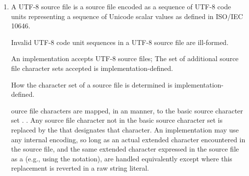 \documentclass{wg21}
\begin{document}
\begin{enumerate}
    \item

\begin{addedblock}
    A UTF-8 source file is a source file encoded as a sequence of UTF-8 code units representing a sequence of Unicode scalar values as defined in ISO/IEC 10646.

    \begin{note}
        Invalid UTF-8 code unit sequences in a UTF-8 source file are ill-formed.
    \end{note}
    An implementation accepts UTF-8 source files; The set of additional source file character sets accepted is implementation-defined.

    How the character set of a source file is determined is implementation-defined.
\end{addedblock}

ource file characters are mapped, in an
 manner,
to the basic source character set .
.
Any source file character not in the basic source character set is replaced by the  that
designates that character.
An implementation may use any internal
encoding, so long as an actual extended character encountered in the
source file, and the same extended character expressed in the source
file as a  (e.g., using the  notation), are handled equivalently except where this replacement is reverted in a raw string literal.


\end{enumerate}
\end{document}
